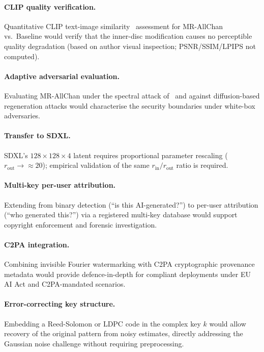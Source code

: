 \documentclass[10pt,twocolumn]{article}
\begin{document}
\paragraph{CLIP quality verification.}
Quantitative CLIP text-image similarity~\cite{radford2021clip}
assessment for MR-AllChan vs.\ Baseline would verify that the
inner-disc modification causes no perceptible quality degradation
(based on author visual inspection; PSNR/SSIM/LPIPS not computed).

\paragraph{Adaptive adversarial evaluation.}
Evaluating MR-AllChan under the spectral attack of~\cite{zhao2023invisible}
and against diffusion-based regeneration attacks would characterise
the security boundaries under white-box adversaries.

\paragraph{Transfer to SDXL.}
SDXL's $128{\times}128{\times}4$ latent requires proportional parameter
rescaling ($r_{\mathrm{out}} \to \approx 20$); empirical validation
of the same $r_{\mathrm{in}}/r_{\mathrm{out}}$ ratio is required.

\paragraph{Multi-key per-user attribution.}
Extending from binary detection (``is this AI-generated?'') to per-user
attribution (``who generated this?'') via a registered multi-key
database would support copyright enforcement and forensic investigation.

\paragraph{C2PA integration.}
Combining invisible Fourier watermarking with C2PA cryptographic
provenance metadata would provide defence-in-depth for compliant
deployments under EU AI Act and C2PA-mandated scenarios.

\paragraph{Error-correcting key structure.}
Embedding a Reed-Solomon or LDPC code in the complex key $k$ would
allow recovery of the original pattern from noisy estimates, directly
addressing the Gaussian noise challenge without requiring preprocessing.
\end{document}
